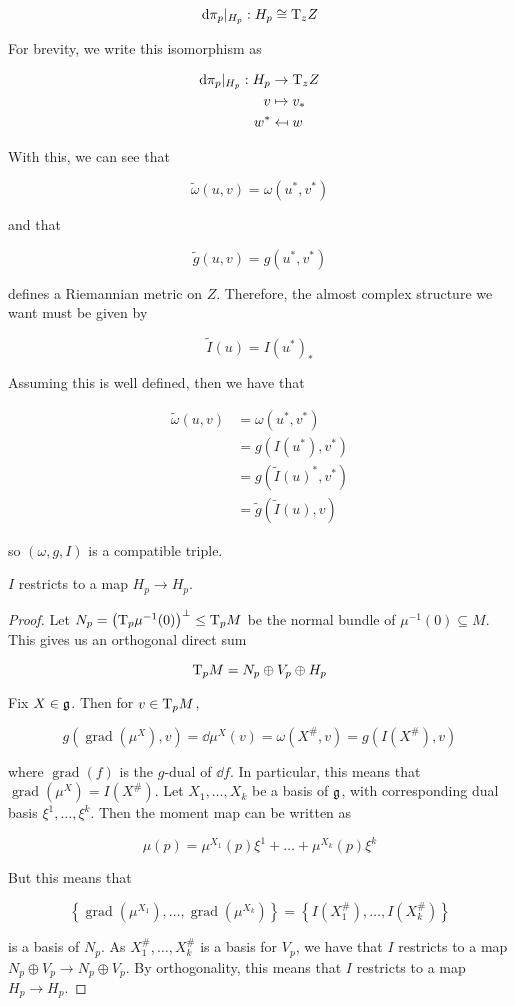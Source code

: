 \documentclass{article}
\renewcommand{\tilde}{\widetilde}
\DeclareMathOperator{\gr}{grad}
\begin{document}
\[\dd\pi_p\vert_{H_p} : H_p \cong \mathrm{T}_zZ\]

For brevity, we write this isomorphism as

\begin{align*}
    \dd\pi_p\vert_{H_p} : H_p &\to \mathrm{T}_zZ \\
    v &\mapsto v_* \\
    w^* &\mapsfrom w
\end{align*}

With this, we can see that

\[\tilde\omega(u, v) = \omega(u^*, v^*)\]

and that

\[\tilde g(u, v) = g(u^*, v^*)\]

defines a Riemannian metric on \(Z\). Therefore, the almost complex structure we want must be given by

\[\tilde I(u) = I(u^*)_*\]

Assuming this is well defined, then we have that

\begin{align*}
    \tilde\omega(u, v) &= \omega(u^*, v^*) \\
    &= g(I(u^*), v^*) \\
    &= g(\tilde I(u)^*, v^*) \\
    &= \tilde g(\tilde I(u), v)
\end{align*}

so \((\omega, g, I)\) is a compatible triple.

\begin{lemma*}
    \(I\) restricts to a map \(H_p \to H_p\).
\end{lemma*}

\begin{proof}
    Let \(N_p = \left(\mathrm{T}_p\mu^{-1}(0)\right)^\perp \le \mathrm{T}_pM\) be the normal bundle of \(\mu^{-1}(0) \subseteq M\). This gives us an orthogonal direct sum

    \[\mathrm{T}_p M = N_p \oplus V_p \oplus H_p\]

    Fix \(X \in \mathfrak{g}\). Then for \(v \in \mathrm{T}_pM\),

    \[g(\gr(\mu^X), v) = \dd\mu^X(v) = \omega(X^\#, v) = g(I(X^\#), v)\]

    where \(\gr(f)\) is the \(g\)-dual of \(\dd f\). In particular, this means that \(\gr(\mu^X) = I(X^\#)\). Let \(X_1, \dots, X_k\) be a basis  of \(\mathfrak{g}\), with corresponding dual basis \(\xi^1, \dots, \xi^k\). Then the moment map can be written as

    \[\mu(p) = \mu^{X_1}(p)\xi^1 + \dots + \mu^{X_k}(p)\xi^k\]

    But this means that

    \[\left\{\gr(\mu^{X_1}), \dots, \gr(\mu^{X_k})\right\} = \left\{I(X_1^\#), \dots, I(X_k^\#)\right\}\]

    is a basis of \(N_p\). As \(X_1^\#, \dots, X_k^\#\) is a basis for \(V_p\), we have that \(I\) restricts to a map \(N_p \oplus V_p \to N_p \oplus V_p\). By orthogonality, this means that \(I\) restricts to a map \(H_p \to H_p\).
\end{proof}
\end{document}
